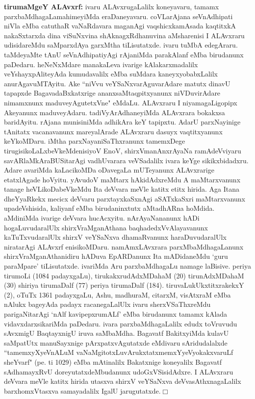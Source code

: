 {\large\textbf{tirumaMgeY ALAvxrf:}} ivaru ALAvxrugaLalilx koneyavaru, tamamx parxbaMdhagaLa\break mahimeyiMda eraDaneyavaru. coVLarAjana seVnAdhipati niVla eMba catuthaR vaNaRdavara maganAgi vaqshicxkamAsada kaqtitxkA nakaSxtarxda dina viSuNxvina shAknagxRdhanuvina aMsharenisi I ALAvxraru udisidareMdu saMparxdAya garxMtha tiLisutatxde. ivaru tuMbA edegAraru. taMdeyaMte tAnU seVnAdhipatiyAgi rAjaniMda parakAlanf eMba birudanunx paDedaru. heNeNxMdare manakaLeva ivarige kAlakarxmadalilx veYshayxpAliteyAda kumudavalilx eMba suMdara kaneyxyobabxLalilx anurAgavuMTAyitu. Ake ``niVvu veYSaNxva\-rAguvarAdare matutx dinavU tapapxde BagavadaBxkatxrige ananxsaMtaqpitxyanunx niVDuvirAdare nimamxnunx maduveyAgutetxVne" eMdaLu. ALAvxraru I niyamagaLigopipx Akeyanunx maduveyAdaru. tadiVyArAdhaneyiMda ALAvxrara bokakxsa baridAyitu. rAjana munisiniMda adhikAra keY tapipxtu. AdarU parxNayinige tAnitatx vacanavanunx mareyalArade ALAvxraru dasuyx vaqtitxyanunx keYkoMDaru. iMtha parxNayaniSaThxranunx tamemxDege tirugisikoLaLxbeVkeMdenisiyoV EnoV, shirxVmanAnxrAyaNa ramAdeVviyaru savARlaMkAraBUSitarAgi vadhUvarara veVSadalilx ivara keYge sikikxbidadxru. Adare avariMda kaLacikoMDa oDavegaLa mUTeyanunx ALAvxrarige etatxlAgade hoVyitu. yAvudoV maMtarx hAkidAdxreMdu A maMtarxvanunx tanage heVLikoDabeVkeMdu Ita deVvara meVle katitx etitx hirida. Aga Itana dheYyaRkekx mecicx deVvaru parxtayxkaSxnAgi aSATxkaSxri maMtarxvanunx upadeVshisida, kaliyanf eMba birudaninxtutx aMtadhARna hoMdida. aMdiniMda ivarige deVvara hucAcxyitu. nArAyaNananunx hADi hogaLuvudaralUlx shirxVraMganAthana baqhadedxVvAlayavanunx kaTuTxvudaralUlx shirxV veYSaNxva dhamaRvanunx haraDuvudaralUlx niratarAgi ALAvxrf enisikoMDaru. namAmxLAvxrara parxMbaMdhagaLanunx shirxVraMganAthanidiru hADuva EpARDanunx Ita mADidaneMdu `guru paraMpare' tiLisutatxde. ivariMda Aru parxbaMdhagaLu namage laBisive. periya tirumoLi ({\rm 1084} padayxgaLu), tirukakxrudAdxMDahaM ({\rm 20}) tirunAdxMDahaM ({\rm 30}) shiriya tirumaDalf ({\rm 77}) periya tirumaDalf ({\rm 184}). tiruvaLukUkxtitxrakekxY ({\rm 2}), oTuTx {\rm 1361} padayxgaLu, Ashu, madhuraM, citarxM, visAtxraM eMba nAlukx bageyAda padayx racanegaLalUlx ivaru sherxVSaThxreMdu parigaNitarAgi `nAlf kavipepxrumALf' eMba birudanunx tamamx kAlada vidavxdarxsikariMda paDedaru. ivara parxbaMdhagaLalilx edudx toVruvudu sAvxmigU BaqtayxnigU iruva saMbaMdha. Bagavatf BakitxyiMda kulavU saMpatUtx manuSayxnige pArxpatxvAgutatxde eMdivaru sAridudalalxde ``tamemxyXyeVnALuM vaNaMgitotxLuvArukxtatxmemxYyeVyokakxvaruLf sheYvarf" (pe. ti {\rm 1029}) eMba mAtinalilx Bakatxnige koneyalilx Bagavatf sAdhamayxRvU doreyutatxdeMbudanunx udoGxVSisidAdxre. I ALAvxraru deVvara meVle katitx hirida utasxva shirxV veYSaNxva deVvasAthxnagaLalilx barxhomxVtasxva samayadalilx IgalU jarugutatxde.\hfill $\Box$

